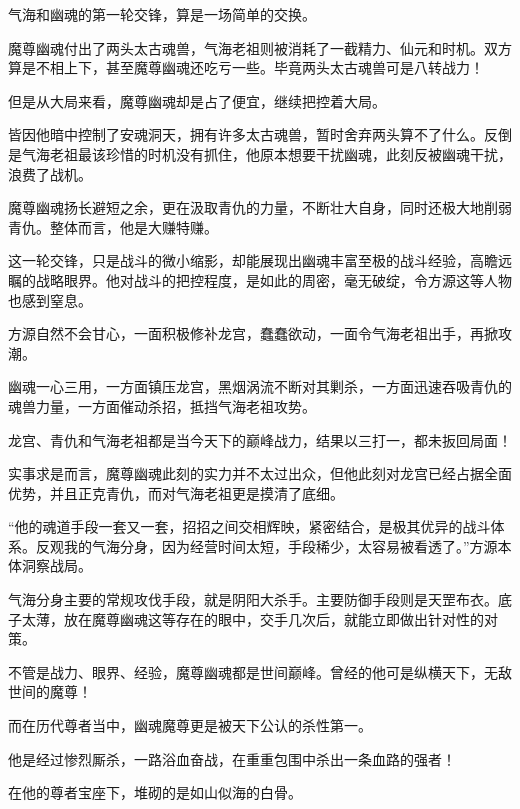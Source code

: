 \begin{this_body}
气海和幽魂的第一轮交锋，算是一场简单的交换。

魔尊幽魂付出了两头太古魂兽，气海老祖则被消耗了一截精力、仙元和时机。双方算是不相上下，甚至魔尊幽魂还吃亏一些。毕竟两头太古魂兽可是八转战力！

但是从大局来看，魔尊幽魂却是占了便宜，继续把控着大局。

皆因他暗中控制了安魂洞天，拥有许多太古魂兽，暂时舍弃两头算不了什么。反倒是气海老祖最该珍惜的时机没有抓住，他原本想要干扰幽魂，此刻反被幽魂干扰，浪费了战机。

魔尊幽魂扬长避短之余，更在汲取青仇的力量，不断壮大自身，同时还极大地削弱青仇。整体而言，他是大赚特赚。

这一轮交锋，只是战斗的微小缩影，却能展现出幽魂丰富至极的战斗经验，高瞻远瞩的战略眼界。他对战斗的把控程度，是如此的周密，毫无破绽，令方源这等人物也感到窒息。

方源自然不会甘心，一面积极修补龙宫，蠢蠢欲动，一面令气海老祖出手，再掀攻潮。

幽魂一心三用，一方面镇压龙宫，黑烟涡流不断对其剿杀，一方面迅速吞吸青仇的魂兽力量，一方面催动杀招，抵挡气海老祖攻势。

龙宫、青仇和气海老祖都是当今天下的巅峰战力，结果以三打一，都未扳回局面！

实事求是而言，魔尊幽魂此刻的实力并不太过出众，但他此刻对龙宫已经占据全面优势，并且正克青仇，而对气海老祖更是摸清了底细。

“他的魂道手段一套又一套，招招之间交相辉映，紧密结合，是极其优异的战斗体系。反观我的气海分身，因为经营时间太短，手段稀少，太容易被看透了。”方源本体洞察战局。

气海分身主要的常规攻伐手段，就是阴阳大杀手。主要防御手段则是天罡布衣。底子太薄，放在魔尊幽魂这等存在的眼中，交手几次后，就能立即做出针对性的对策。

不管是战力、眼界、经验，魔尊幽魂都是世间巅峰。曾经的他可是纵横天下，无敌世间的魔尊！

而在历代尊者当中，幽魂魔尊更是被天下公认的杀性第一。

他是经过惨烈厮杀，一路浴血奋战，在重重包围中杀出一条血路的强者！

在他的尊者宝座下，堆砌的是如山似海的白骨。

\end{this_body}

